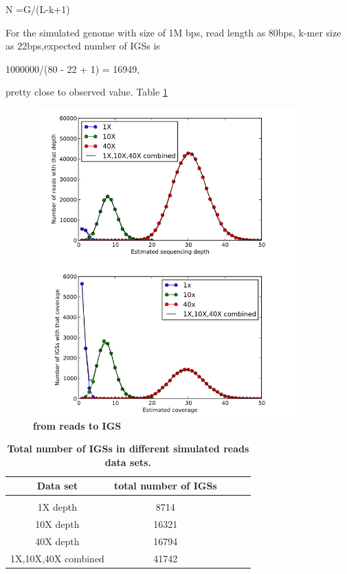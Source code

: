 \documentclass{article}
\begin{document}
N =G/(L-k+1)

For the simulated genome with size of 1M bps, read length as 80bps, k-mer size as 22bps,expected number of IGSs is 

1000000/(80 - 22 + 1) = 16949, 

pretty close to observed value. Table \ref{table:IGSs}


\begin{figure}[!ht]
\centerline{\includegraphics[width=4in]{./figures/from_reads_to_IGS.png}}
\caption{\bf from reads to IGS}
\label{fig:reads_to_IGS}
\end{figure}

\begin{table}[!ht]
\caption{
\bf{Total number of IGSs in different simulated reads data sets.}
}
\begin{tabular}{ |c | c |c| c|c| }
Data set & total number of IGSs \\
\hline \\
1X depth                   & 8714  \\
10X depth                  & 16321  \\
40X depth                  & 16794 \\
1X,10X,40X combined        & 41742 \\
\end{tabular}
\begin{flushleft}
\end{flushleft}
\label{table:IGSs}
\end{table}
\end{document}
